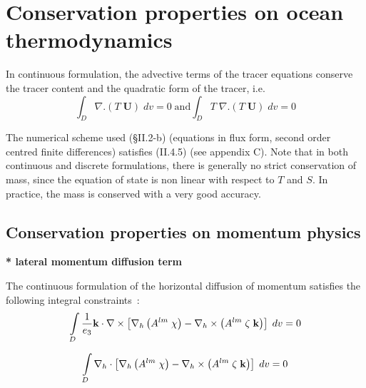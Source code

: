\documentclass[../tex_main/NEMO_manual]{subfiles}
\begin{document}
\section{Conservation properties on ocean thermodynamics}
\label{sec:Invariant_tra}

In continuous formulation, the advective terms of the tracer equations 
conserve the tracer content and the quadratic form of the tracer, i.e.
\begin{equation} \label{eq:tra_tra2}
\int_D {\nabla .\left( {T\;{\textbf{U}}} \right)\;dv} =0
\;\text{and}
\int_D {T\;\nabla .\left( {T\;{\textbf{U}}} \right)\;dv} =0
\end{equation}

The numerical scheme used ({\S}II.2-b) (equations in flux form, second order 
centred finite differences) satisfies (II.4.5) (see appendix C). Note that 
in both continuous and discrete formulations, there is generally no strict 
conservation of mass, since the equation of state is non linear with respect 
to $T$ and $S$. In practice, the mass is conserved with a very good accuracy. 

\subsection{Conservation properties on momentum physics}
\label{subsec:Invariant_dyn_physics}

\textbf{* lateral momentum diffusion term}

The continuous formulation of the horizontal diffusion of momentum satisfies 
the following integral constraints~:
\begin{equation} \label{eq:dynldf_dyn}
\int\limits_D {\frac{1}{e_3 }{\rm {\bf k}}\cdot \nabla \times \left[ {\nabla 
_h \left( {A^{lm}\;\chi } \right)-\nabla _h \times \left( {A^{lm}\;\zeta 
\;{\rm {\bf k}}} \right)} \right]\;dv} =0
\end{equation}

\begin{equation} \label{eq:dynldf_div}
\int\limits_D {\nabla _h \cdot \left[ {\nabla _h \left( {A^{lm}\;\chi } 
\right)-\nabla _h \times \left( {A^{lm}\;\zeta \;{\rm {\bf k}}} \right)} 
\right]\;dv} =0
\end{equation}
\end{document}

